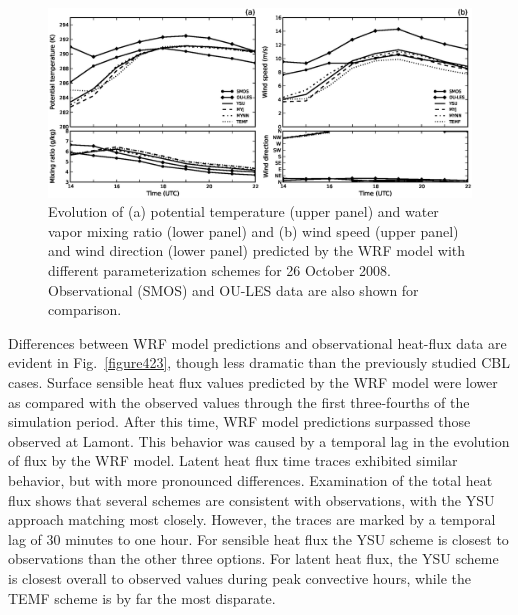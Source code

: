 \begin{figure}[ht!]
\begin{center}
\includegraphics[width=\textwidth]{figures/chapter4/meteogram_phys_20081026}
\end{center}
\caption{Evolution of (a) potential temperature (upper panel) and water vapor mixing ratio (lower panel) and (b) wind speed (upper panel) and wind direction (lower panel) predicted by the WRF model with different parameterization schemes for 26 October 2008. Observational (SMOS) and OU-LES data are also shown for comparison.}
\label{figure422}
\end{figure}


Differences between WRF model predictions and observational heat-flux data are evident in Fig.~\ref{figure423}, though less dramatic than the previously studied CBL cases. Surface sensible heat flux values predicted by the WRF model were lower as compared with the observed values through the first three-fourths of the simulation period. After this time, WRF model predictions surpassed those observed at Lamont. This behavior was caused by a temporal lag in the evolution of flux by the WRF model. Latent heat flux time traces exhibited similar behavior, but with more pronounced differences. Examination of the total heat flux shows that several schemes are consistent with observations, with the YSU approach matching most closely. However, the traces are marked by a temporal lag of $30$ minutes to one hour. For sensible heat flux the YSU scheme is closest to observations than the other three options. For latent heat flux, the YSU scheme is closest overall to observed values during peak convective hours, while the TEMF scheme is by far the most disparate. 



